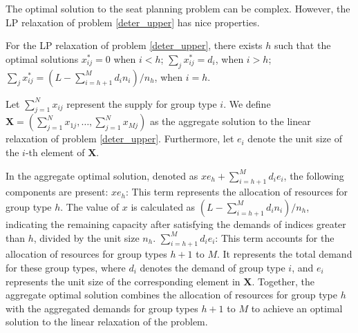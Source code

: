 

The optimal solution to the seat planning problem can be complex. However, the LP relaxation of problem \eqref{deter_upper} has nice properties.

\begin{prop}\label{sol_relax_deter}
For the LP relaxation of problem \eqref{deter_upper}, there exists $h$ such that the optimal solutions $x_{ij}^{*} = 0$ when $i < h$; $\sum_{j} x_{ij}^{*} = d_{i}$, when $i > h$; $\sum_{j} x_{ij}^{*} = (L - \sum_{i = h+1}^{M} {d_i n_i})/ n_h$, when $i = h$.
\end{prop}

Let $\sum_{j=1}^{N} x_{ij}$ represent the supply for group type $i$. We define $\mathbf{X} = (\sum_{j=1}^{N} x_{1j},\ldots, \sum_{j=1}^{N} x_{Mj})$ as the aggregate solution to the linear relaxation of problem \eqref{deter_upper}. Furthermore, let $e_{i}$ denote the unit size of the $i$-th element of $\mathbf{X}$.

In the aggregate optimal solution, denoted as $x e_{h} + \sum_{i=h+1} ^{M} d_{i} e_{i}$, the following components are present: $x e_{h}$: This term represents the allocation of resources for group type $h$. The value of $x$ is calculated as $(L- \sum_{i = h+1}^{M} {d_i n_i})/ n_h$, indicating the remaining capacity after satisfying the demands of indices greater than $h$, divided by the unit size $n_h$. $\sum_{i=h+1} ^{M} d_{i} e_{i}$: This term accounts for the allocation of resources for group types $h+1$ to $M$. It represents the total demand for these group types, where $d_i$ denotes the demand of group type $i$, and $e_{i}$ represents the unit size of the corresponding element in $\mathbf{X}$. Together, the aggregate optimal solution combines the allocation of resources for group type $h$ with the aggregated demands for group types $h+1$ to $M$ to achieve an optimal solution to the linear relaxation of the problem.



